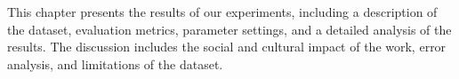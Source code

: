 
This chapter presents the results of our experiments, including a description of the dataset, evaluation metrics, parameter settings, and a detailed analysis of the results. The discussion includes the social and cultural impact of the work, error analysis, and limitations of the dataset.
